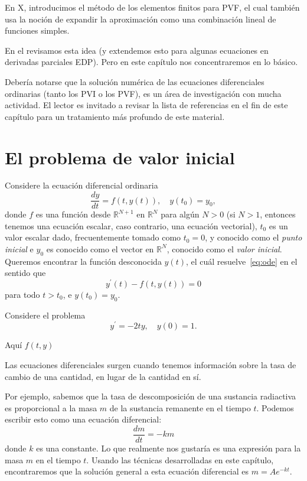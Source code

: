 En X, %
introducimos el método de los elementos finitos para PVF, el cual también usa la noción de expandir la aproximación como una combinación lineal de funciones simples. 

En el %
revisamos esta idea (y extendemos esto para algunas ecuaciones en derivadas parciales EDP). Pero en este capítulo nos concentraremos en lo básico.

Debería notarse que la solución numérica de las ecuaciones diferenciales ordinarias (tanto los PVI o los PVF), es un área de investigación con mucha actividad. El lector es invitado a revisar la lista de referencias en el fin de este capítulo para un tratamiento más profundo de este material.

\section{El problema de valor inicial}
Considere la ecuación diferencial ordinaria
\begin{equation}\label{eq:ode}
\frac{dy}{dt}=f\left(t,y\left(t\right)\right),\quad y\left(t_{0}\right)=y_{0},
\end{equation}
 donde $f$ es una función desde $\mathds{R}^{N+1}$ en $\mathds{R}^{N}$ para algún  $N>0$ (si $N>1$, entonces tenemos una ecuación escalar, caso contrario, una ecuación vectorial), $t_{0}$ es un valor escalar dado, frecuentemente tomado como $t_{0}=0$, y conocido como el \emph{punto inicial} e $y_{0}$ es conocido como el vector en $\mathds{R}^{N}$, conocido como el \emph{valor inicial}. Queremos encontrar la función desconocida $y\left(t\right)$, el cuál resuelve~\eqref{eq:ode} en el sentido que \[ y^{\prime}\left(t\right)-f\left(t,y\left(t\right)\right)=0 \] para todo $t>t_{0}$, e $y\left(t_{0}\right)=y_{0}$.
 
\begin{example}
	Considere el problema \[ y^{\prime}=-2ty,\quad y\left(0\right)=1. \]
\end{example}
Aquí $f\left(t,y\right)$
\newpage

Las ecuaciones diferenciales surgen cuando tenemos información sobre la tasa de cambio de una cantidad, en lugar de la cantidad en sí.

Por ejemplo, sabemos que la tasa de descomposición de una sustancia radiactiva es proporcional a la masa $m$ de la sustancia remanente en el tiempo $t$. Podemos escribir esto como una ecuación diferencial:
\[ \frac{dm}{dt}=-km \]
donde $k$ es una constante. Lo que realmente nos gustaría es una expresión para la masa $m$ en el tiempo $t$. Usando las técnicas desarrolladas en este capítulo, encontraremos que la solución general a esta ecuación diferencial es $m=Ae^{-kt}$.

